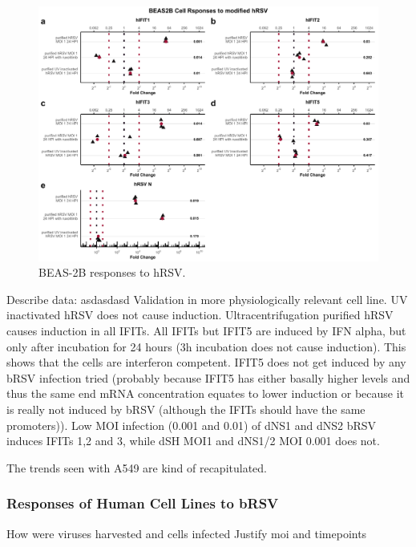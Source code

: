 \begin{figure}
    \centering
    \includegraphics[width=1\linewidth]{06. Chapter 1/Figs/01. Induction/10. beas2b_hrsv.pdf}
    \caption[BEAS-2B responses to hRSV.]{BEAS-2B responses to hRSV.}
    \label{BEAS-2B responses to hRSV.}
\end{figure}



Describe data: \newline
asdasdasd \newline
Validation in more physiologically relevant cell line. UV inactivated hRSV does not cause induction. Ultracentrifugation purified hRSV causes induction in all IFITs. All IFITs but IFIT5 are induced by IFN alpha, but only after incubation for 24 hours (3h incubation does not cause induction). This shows that the cells are interferon competent. IFIT5 does not get induced by any bRSV infection tried (probably because IFIT5 has either basally higher levels and thus the same end mRNA concentration equates to lower induction or because it is really not induced by bRSV (although the IFITs should have the same promoters)). Low MOI infection (0.001 and 0.01) of dNS1 and dNS2 bRSV induces IFITs 1,2 and 3, while dSH MOI1 and dNS1/2 MOI 0.001 does not. 

The trends seen with A549 are kind of recapitulated.

\subsubsection{Responses of Human Cell Lines to bRSV} \label{Responses of Human Cell Lines to bRSV}
How were viruses harvested and cells infected \newline
Justify moi and timepoints

